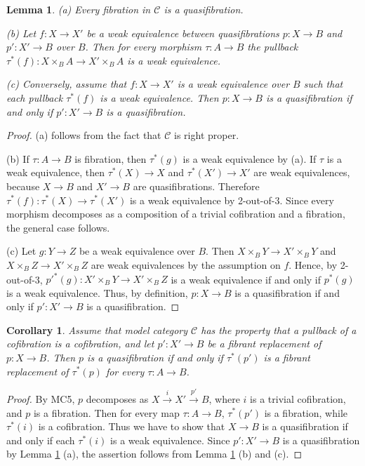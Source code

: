 \documentclass[12pt]{amsart}
\theoremstyle{plain}
\newtheorem{Cor}[Thm]{Corollary}
\newtheorem{Lem}[Thm]{Lemma}
\theoremstyle{definition}
\numberwithin{equation}{section}
\newcommand{\cal}[1]{\mathcal{#1}}
\newcommand{\C}[1]{\cal#1}
\newcommand{\lra}{\longrightarrow}
\newcommand{\rl}[1]{Lemma \ref{L:#1}}
\begin{document}
\begin{Lem} \label{L:qfib}
(a) Every fibration in ${\C{C}}$ is a quasifibration.

(b) Let $f:X\to X'$ be a weak equivalence between quasifibrations
$p:X\to B$ and $p':X'\to B$ over $B$.  Then  for every morphism
$\tau:A\to B$ the pullback $\tau^*(f):X\times_B A\to X'\times_B A$
is a weak equivalence.

(c) Conversely, assume that $f:X\to X'$ is a weak equivalence over
$B$ such that each pullback $\tau^*(f)$ is a weak equivalence.
Then $p:X\to B$ is a quasifibration if and only if $p':X'\to B$ is
a quasifibration.
\end{Lem}

\begin{proof}
(a) follows from the fact that ${\C{C}}$ is right proper.

(b)  If $\tau:A\to B$ is fibration, then $\tau^*(g)$ is a weak
equivalence by (a). If $\tau$ is a weak equivalence, then
$\tau^*(X)\to X$ and $\tau^*(X')\to X'$ are weak equivalences,
because $X\to B$ and $X'\to B$ are quasifibrations. Therefore
$\tau^*(f):\tau^*(X)\to\tau^*(X')$ is a weak equivalence by 
2-out-of-3. Since every morphism decomposes as a
composition of a trivial cofibration and a fibration, the general
case follows.

(c) Let $g:Y\to Z$ be a weak equivalence over $B$. Then
$X\times_B Y\to X'\times_B Y$ and $X\times_B
Z\to X'\times_B Z$ are weak equivalences by the assumption on $f$.
Hence, by 2-out-of-3, $p'^*(g): X'\times_B Y\to
X'\times_B Z$ is a weak equivalence if and only if $p^*(g)$ is
a weak equivalence. Thus, by definition, $p:X\to B$ is a
quasifibration if and only if $p':X'\to B$ is a quasifibration.
\end{proof}

\begin{Cor} \label{C:fibrep}
Assume that model category ${\C{C}}$ has the property that a
pullback of a cofibration is a cofibration, and let $p':X'\to B$
be a fibrant replacement of $p:X\to B$. Then $p$ is a
quasifibration if and only if $\tau^*(p')$ is a fibrant
replacement of $\tau^*(p)$ for every $\tau:A\to B$.
\end{Cor}

\begin{proof}
By MC5, $p$ decomposes as $X\overset{i}{\lra}X'\overset{p'}{\lra}B$, 
where $i$ is a trivial cofibration, and $p$ is a fibration. 
Then for every map $\tau:A\to B$, $\tau^*(p')$ is a fibration, while $\tau^*(i)$ is 
a cofibration. Thus we have to show that $X\to B$
is a quasifibration if and only if each $\tau^*(i)$ is a weak
equivalence. Since $p':X'\to B$ is a quasifibration by \rl{qfib}
(a), the assertion follows from \rl{qfib} (b) and (c).
\end{proof}
\end{document}
